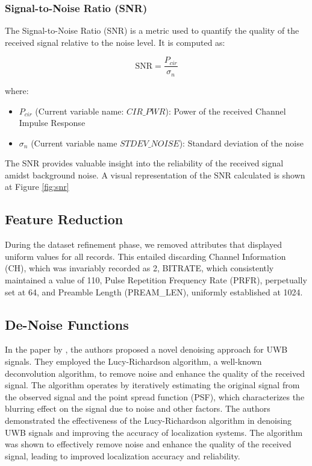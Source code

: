\subsubsection{Signal-to-Noise Ratio (SNR)}\label{snr}

The Signal-to-Noise Ratio (SNR) is a metric used to quantify the quality of the received signal relative to the noise level. It is computed as:

\begin{equation}
  \text{SNR} = \frac{P_{cir}}{\sigma_n}
\end{equation}

where:

\begin{itemize}
  \item $P_{cir}$ (Current variable name: $CIR\_PWR$): Power of the received Channel Impulse Response
  \item $\sigma_n$ (Current variable name $STDEV\_NOISE$): Standard deviation of the noise
\end{itemize}

The SNR provides valuable insight into the reliability of the received signal amidst background noise. A visual representation of the SNR calculated is shown at Figure \ref{fig:snr}

\subsection{Feature Reduction}\label{feature_reduction}
During the dataset refinement phase, we removed attributes that displayed uniform values for all records. This entailed discarding Channel Information (CH), which was invariably recorded as 2, BITRATE, which consistently maintained a value of 110, Pulse Repetition Frequency Rate (PRFR), perpetually set at 64, and Preamble Length (PREAM\_LEN), uniformly established at 1024.

\subsection{De-Noise Functions}\label{de_noise_Functions}

In the paper by \cite{jiang_uwb_2020}, the authors proposed a novel denoising approach for UWB signals. They employed the Lucy-Richardson algorithm, a well-known deconvolution algorithm, to remove noise and enhance the quality of the received signal. The algorithm operates by iteratively estimating the original signal from the observed signal and the point spread function (PSF), which characterizes the blurring effect on the signal due to noise and other factors. The authors demonstrated the effectiveness of the Lucy-Richardson algorithm in denoising UWB signals and improving the accuracy of localization systems. The algorithm was shown to effectively remove noise and enhance the quality of the received signal, leading to improved localization accuracy and reliability.

